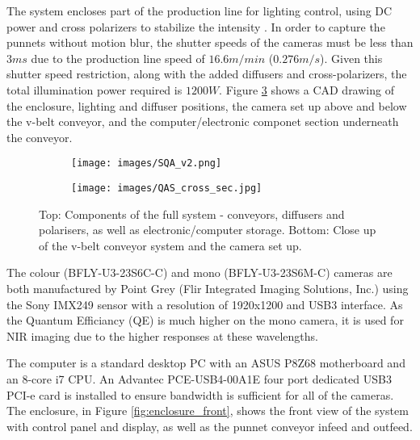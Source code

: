 \documentclass{bmvc2k}
\begin{document}
The system encloses part of the production line for lighting control, using DC power and cross polarizers to stabilize the intensity \cite{eaton}. In order to capture the punnets without motion blur, the shutter speeds of the cameras must be less than $3ms$ due to the production line speed of $16.6m/min$ ($0.276m/s$). Given this shutter speed restriction, along with the added diffusers and cross-polarizers, the total illumination power required is $1200W$. Figure \ref{fig:sample1} shows a CAD drawing of the enclosure, lighting and diffuser positions, the camera set up above and below the v-belt conveyor, and the computer/electronic componet section underneath the conveyor.

\begin{figure}[ht]
	\centering
	\begin{subfigure}
		\centering
		\texttt{[image: images/SQA\_v2.png]}

		\label{fig:enclosure_cross_sec}
	\end{subfigure}%
	
	\vspace{\floatsep}
	
	\begin{subfigure}
		\centering
		\texttt{[image: images/QAS\_cross\_sec.jpg]}

		\label{fig:close_up_cross_sec}
	\end{subfigure}%
	
	\caption{Top: Components of the full system - conveyors, diffusers and polarisers, as well as electronic/computer storage. Bottom: Close up of the v-belt conveyor system and the camera set up. }
	\label{fig:sample1}
\end{figure}

The colour (BFLY-U3-23S6C-C) and mono (BFLY-U3-23S6M-C) cameras are both manufactured by Point Grey (Flir Integrated Imaging Solutions, Inc.) using the Sony IMX249 sensor with a resolution of 1920x1200 and USB3 interface. As the Quantum Efficiancy (QE) is much higher on the mono camera, it is used for NIR imaging due to the higher responses at these wavelengths.

The computer is a standard desktop PC with an ASUS P8Z68 motherboard and an 8-core i7 CPU. An Advantec PCE-USB4-00A1E four port dedicated USB3 PCI-e card is installed to ensure bandwidth is sufficient for all of the cameras. The enclosure, in Figure \ref{fig:enclosure_front}, shows the front view of the system with control panel and display, as well as the punnet conveyor infeed and outfeed. 
\end{document}
